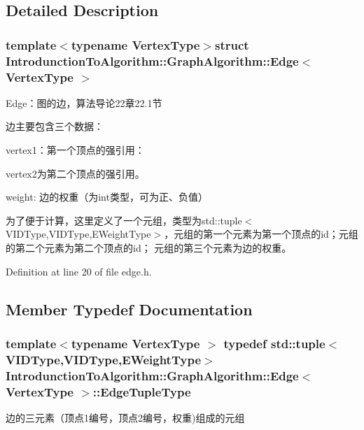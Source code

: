 \subsection{Detailed Description}
\subsubsection*{template$<$typename Vertex\+Type$>$struct Introdunction\+To\+Algorithm\+::\+Graph\+Algorithm\+::\+Edge$<$ Vertex\+Type $>$}

Edge：图的边，算法导论22章22.1节 

边主要包含三个数据：


\begin{DoxyItemize}
\item {\ttfamily vertex1}：第一个顶点的强引用：
\item {\ttfamily vertex2}为第二个顶点的强引用。
\item {\ttfamily weight}\+: 边的权重（为int类型，可为正、负值）
\end{DoxyItemize}

为了便于计算，这里定义了一个元组，类型为{\ttfamily std\+::tuple$<$V\+I\+D\+Type,V\+I\+D\+Type,E\+Weight\+Type$>$}，元组的第一个元素为第一个顶点的{\ttfamily id}；元组的第二个元素为第二个顶点的{\ttfamily id}； 元组的第三个元素为边的权重。 

Definition at line 20 of file edge.\+h.



\subsection{Member Typedef Documentation}
\hypertarget{struct_introdunction_to_algorithm_1_1_graph_algorithm_1_1_edge_adaaedd6d4205248ecf521e8585a2ecf6}{}
\subsubsection[{Edge\+Tuple\+Type}]{\setlength{\rightskip}{0pt plus 5cm}template$<$typename Vertex\+Type $>$ typedef std\+::tuple$<${\bf V\+I\+D\+Type},{\bf V\+I\+D\+Type},{\bf E\+Weight\+Type}$>$ {\bf Introdunction\+To\+Algorithm\+::\+Graph\+Algorithm\+::\+Edge}$<$ Vertex\+Type $>$\+::{\bf Edge\+Tuple\+Type}}\label{struct_introdunction_to_algorithm_1_1_graph_algorithm_1_1_edge_adaaedd6d4205248ecf521e8585a2ecf6}
边的三元素（顶点1编号，顶点2编号，权重)组成的元组 


